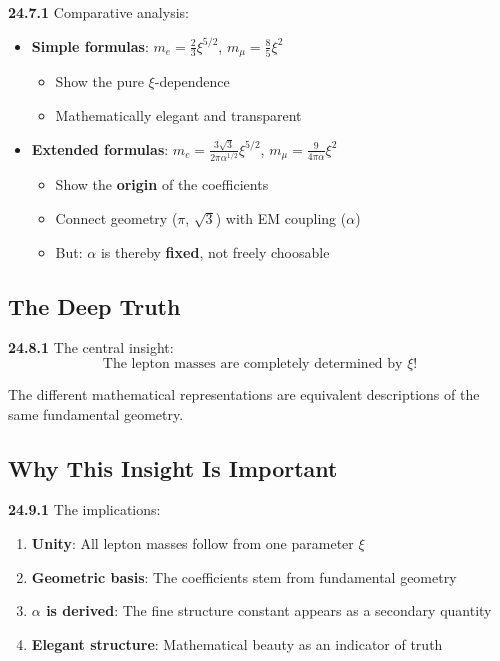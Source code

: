 \noindent \textbf{24.7.1} Comparative analysis:
\begin{itemize}
	\item \textbf{Simple formulas}: $m_e = \frac{2}{3}\xi^{5/2}$, $m_\mu = \frac{8}{5}\xi^2$
	\begin{itemize}
		\item Show the pure $\xi$-dependence
		\item Mathematically elegant and transparent
	\end{itemize}
	
	\item \textbf{Extended formulas}: $m_e = \frac{3\sqrt{3}}{2\pi\alpha^{1/2}}\xi^{5/2}$, $m_\mu = \frac{9}{4\pi\alpha}\xi^2$
	\begin{itemize}
		\item Show the \textbf{origin} of the coefficients
		\item Connect geometry ($\pi$, $\sqrt{3}$) with EM coupling ($\alpha$)
		\item But: $\alpha$ is thereby \textbf{fixed}, not freely choosable
	\end{itemize}
\end{itemize}

\subsection{The Deep Truth}

\noindent \textbf{24.8.1} The central insight:
\[
\boxed{
	\text{The lepton masses are completely determined by } \xi \text{!}
}
\]

The different mathematical representations are equivalent descriptions of the same fundamental geometry.

\subsection{Why This Insight Is Important}

\noindent \textbf{24.9.1} The implications:
\begin{enumerate}
	\item \textbf{Unity}: All lepton masses follow from one parameter $\xi$
	\item \textbf{Geometric basis}: The coefficients stem from fundamental geometry
	\item \textbf{$\alpha$ is derived}: The fine structure constant appears as a secondary quantity
	\item \textbf{Elegant structure}: Mathematical beauty as an indicator of truth
\end{enumerate}

